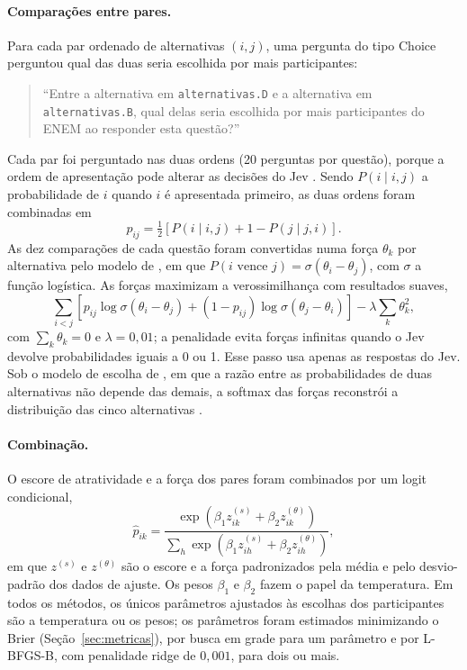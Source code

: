\paragraph{Comparações entre pares.} Para cada par ordenado de alternativas $(i, j)$, uma pergunta do tipo Choice perguntou qual das duas seria escolhida por mais participantes:
\begin{quote}
\small ``Entre a alternativa em \texttt{alternativas.D} e a alternativa em \texttt{alternativas.B}, qual delas seria escolhida por mais participantes do ENEM ao responder esta questão?''
\end{quote}
Cada par foi perguntado nas duas ordens (20 perguntas por questão), porque a ordem de apresentação pode alterar as decisões do Jev \citep{li2026}. Sendo $P(i \mid i, j)$ a probabilidade de $i$ quando $i$ é apresentada primeiro, as duas ordens foram combinadas em
\begin{equation}
p_{ij} = \tfrac{1}{2}\left[ P(i \mid i, j) + 1 - P(j \mid j, i) \right].
\end{equation}
As dez comparações de cada questão foram convertidas numa força $\theta_k$ por alternativa pelo modelo de \citet{bradley1952}, em que $P(i \text{ vence } j) = \sigma(\theta_i - \theta_j)$, com $\sigma$ a função logística. As forças maximizam a verossimilhança com resultados suaves,
\begin{equation}
\sum_{i<j} \left[ p_{ij} \log \sigma(\theta_i - \theta_j) + (1 - p_{ij}) \log \sigma(\theta_j - \theta_i) \right] - \lambda \sum_k \theta_k^2,
\end{equation}
com $\sum_k \theta_k = 0$ e $\lambda = 0{,}01$; a penalidade evita forças infinitas quando o Jev devolve probabilidades iguais a 0 ou 1. Esse passo usa apenas as respostas do Jev. Sob o modelo de escolha de \citet{luce1959}, em que a razão entre as probabilidades de duas alternativas não depende das demais, a softmax das forças reconstrói a distribuição das cinco alternativas \citep{love1997,revuelta2005}.

\paragraph{Combinação.} O escore de atratividade e a força dos pares foram combinados por um logit condicional,
\begin{equation}\label{eq:combinacao}
\hat{p}_{ik} = \frac{\exp(\beta_1 z^{(s)}_{ik} + \beta_2 z^{(\theta)}_{ik})}{\sum_{h} \exp(\beta_1 z^{(s)}_{ih} + \beta_2 z^{(\theta)}_{ih})},
\end{equation}
em que $z^{(s)}$ e $z^{(\theta)}$ são o escore e a força padronizados pela média e pelo desvio-padrão dos dados de ajuste. Os pesos $\beta_1$ e $\beta_2$ fazem o papel da temperatura. Em todos os métodos, os únicos parâmetros ajustados às escolhas dos participantes são a temperatura ou os pesos; os parâmetros foram estimados minimizando o Brier (Seção~\ref{sec:metricas}), por busca em grade para um parâmetro e por L-BFGS-B, com penalidade ridge de $0{,}001$, para dois ou mais.

